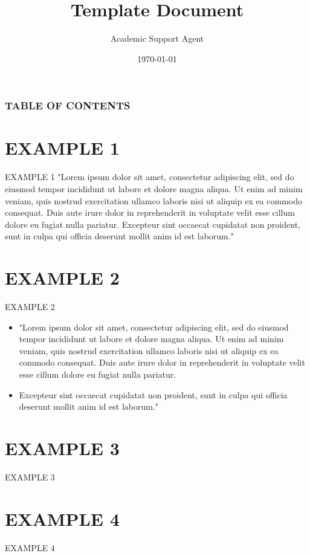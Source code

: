 \documentclass{article}
\title{Template Document}
\author{Academic Support Agent}
\date{\today}
\begin{document}
\maketitle

\titlepage

\begin{frame}

 \frametitle{TABLE OF CONTENTS}
 
\end{frame}

\section{EXAMPLE 1} %
\begin{frame}{EXAMPLE 1}%
"Lorem ipsum dolor sit amet, consectetur adipiscing elit, sed do eiusmod tempor incididunt ut labore et dolore magna aliqua. Ut enim ad minim veniam, quis nostrud exercitation ullamco laboris nisi ut aliquip ex ea commodo consequat. Duis aute irure dolor in reprehenderit in voluptate velit esse cillum dolore eu fugiat nulla pariatur. Excepteur sint occaecat cupidatat non proident, sunt in culpa qui officia deserunt mollit anim id est laborum."
    
\end{frame}

\section{EXAMPLE 2}
\begin{frame}{EXAMPLE 2}
\begin{itemize}

  \setlength\itemsep{1em}  %
  
    \item "Lorem ipsum dolor sit amet, consectetur adipiscing elit, sed do eiusmod tempor incididunt ut labore et dolore magna aliqua. Ut enim ad minim veniam, quis nostrud exercitation ullamco laboris nisi ut aliquip ex ea commodo consequat. Duis aute irure dolor in reprehenderit in voluptate velit esse cillum dolore eu fugiat nulla pariatur. 
    
    \item Excepteur sint occaecat cupidatat non proident, sunt in culpa qui officia deserunt mollit anim id est laborum."
\end{itemize}
\end{frame}

\section{EXAMPLE 3}
\begin{frame}{EXAMPLE 3}
    
\end{frame}

\section{EXAMPLE 4}
\begin{frame}{EXAMPLE 4}
    
\end{frame}
\end{document}
